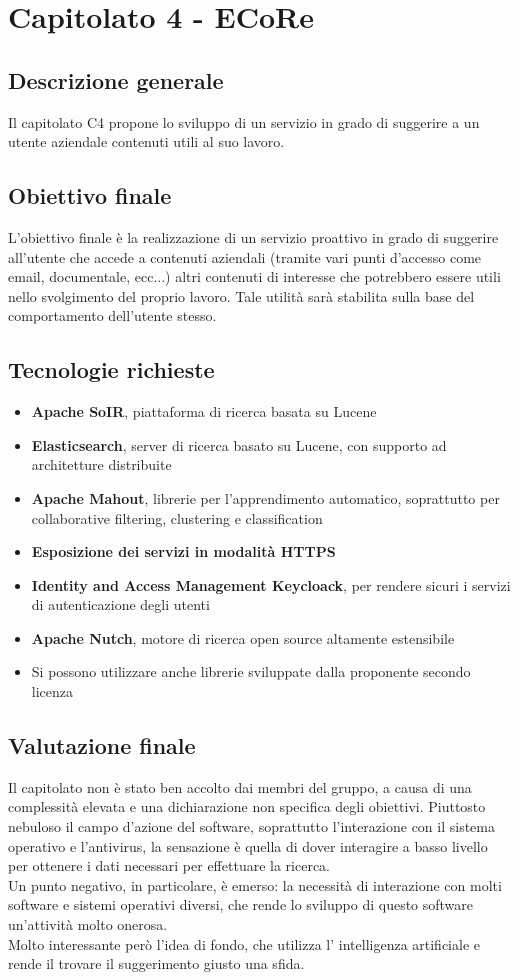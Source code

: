 \documentclass[main.tex]{subfiles}
\begin{document}
\chapter{Capitolato 4 - ECoRe}
\section{Descrizione generale}
Il capitolato C4 propone lo sviluppo di un servizio in grado di suggerire a un utente aziendale contenuti utili al suo lavoro.
\section{Obiettivo finale}
L'obiettivo finale è la realizzazione di un servizio proattivo in grado di suggerire all'utente che accede a contenuti aziendali (tramite vari punti d'accesso come email, documentale, ecc...) altri contenuti di interesse che potrebbero essere utili nello svolgimento del proprio lavoro. Tale utilità sarà stabilita sulla base del comportamento dell'utente stesso.
\section{Tecnologie richieste}
\begin{itemize}
	\item \textbf{Apache SoIR}, piattaforma di ricerca basata su Lucene
	\item \textbf{Elasticsearch}, server di ricerca basato su Lucene, con supporto ad architetture distribuite
	\item \textbf{Apache Mahout}, librerie per l'apprendimento automatico, soprattutto per collaborative filtering, clustering e classification
	\item \textbf{Esposizione dei servizi in modalità HTTPS}
	\item \textbf{Identity and Access Management Keycloack}, per rendere sicuri i servizi di autenticazione degli utenti
	\item \textbf{Apache Nutch}, motore di ricerca open source altamente estensibile
	\item Si possono utilizzare anche librerie  sviluppate dalla proponente secondo licenza
\end{itemize}
\section{Valutazione finale}
Il capitolato non è stato ben accolto dai membri del gruppo, a causa di una complessità elevata e una dichiarazione non specifica degli obiettivi. Piuttosto nebuloso il campo d'azione del software, soprattutto l'interazione con il sistema operativo e l'antivirus, la sensazione è quella di dover interagire a basso livello per ottenere i dati necessari per effettuare la ricerca.\\
Un punto negativo, in particolare, è emerso: la necessità di interazione con molti software e sistemi operativi diversi, che rende lo sviluppo di questo software un'attività molto onerosa.\\
Molto interessante però l'idea di fondo, che utilizza l' intelligenza artificiale e rende il trovare il suggerimento giusto una sfida.
\end{document}
